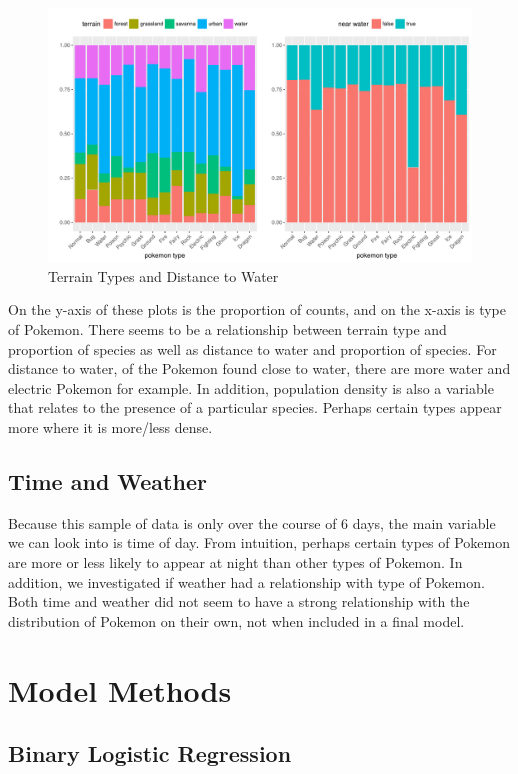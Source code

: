 \documentclass{article}
\begin{document}
\begin{figure}[H]
\centering
\includegraphics[scale = 0.5]{side_by_side_plot.pdf}
\caption{Terrain Types and Distance to Water}
\end{figure}

\noindent On the y-axis of these plots is the proportion of counts, and on the x-axis is type of Pokemon. There seems to be a relationship between terrain type and proportion of species as well as distance to water and proportion of species. For distance to water, of the Pokemon found close to water, there are more water and electric Pokemon for example. In addition, population density is also a variable that relates to the presence of a particular species. Perhaps certain types appear more where it is more/less dense.

\subsection{Time and Weather}

Because this sample of data is only over the course of 6 days, the main variable we can look into is time of day. From intuition, perhaps certain types of Pokemon are more or less likely to appear at night than other types of Pokemon. In addition, we investigated if weather had a relationship with type of Pokemon. Both time and weather did not seem to have a strong relationship with the distribution of Pokemon on their own, not when included in a final model.

\section{Model Methods}

\subsection{Binary Logistic Regression} 
\end{document}
